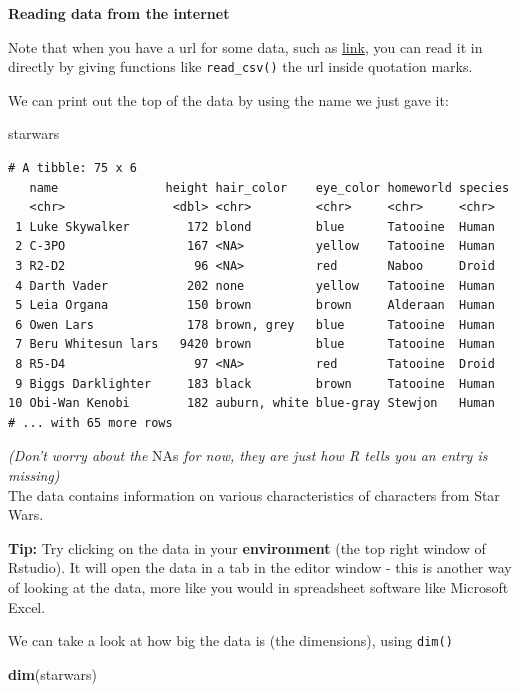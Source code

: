 \documentclass[]{book}
\newenvironment{Shaded}{\begin{snugshade}}{\end{snugshade}}
\newcommand{\KeywordTok}[1]{\textcolor[rgb]{0.13,0.29,0.53}{\textbf{#1}}}
\newcommand{\NormalTok}[1]{#1}
\begin{document}
\textbf{Reading data from the internet}

Note that when you have a url for some data, such as \href{url}{link}, you can read it in directly by giving functions like \texttt{read\_csv()} the url inside quotation marks.

We can print out the top of the data by using the name we just gave it:

\begin{Shaded}
\begin{Highlighting}[]
\NormalTok{starwars}
\end{Highlighting}
\end{Shaded}

\begin{verbatim}
# A tibble: 75 x 6
   name               height hair_color    eye_color homeworld species
   <chr>               <dbl> <chr>         <chr>     <chr>     <chr>  
 1 Luke Skywalker        172 blond         blue      Tatooine  Human  
 2 C-3PO                 167 <NA>          yellow    Tatooine  Human  
 3 R2-D2                  96 <NA>          red       Naboo     Droid  
 4 Darth Vader           202 none          yellow    Tatooine  Human  
 5 Leia Organa           150 brown         brown     Alderaan  Human  
 6 Owen Lars             178 brown, grey   blue      Tatooine  Human  
 7 Beru Whitesun lars   9420 brown         blue      Tatooine  Human  
 8 R5-D4                  97 <NA>          red       Tatooine  Droid  
 9 Biggs Darklighter     183 black         brown     Tatooine  Human  
10 Obi-Wan Kenobi        182 auburn, white blue-gray Stewjon   Human  
# ... with 65 more rows
\end{verbatim}

\emph{(Don't worry about the} NAs \emph{for now, they are just how R tells you an entry is missing)}\\
The data contains information on various characteristics of characters from Star Wars.

\textbf{Tip:} Try clicking on the data in your \textbf{environment} (the top right window of Rstudio). It will open the data in a tab in the editor window - this is another way of looking at the data, more like you would in spreadsheet software like Microsoft Excel.

We can take a look at how big the data is (the dimensions), using \texttt{dim()}

\begin{Shaded}
\begin{Highlighting}[]
\KeywordTok{dim}\NormalTok{(starwars)}
\end{Highlighting}
\end{Shaded}
\end{document}
